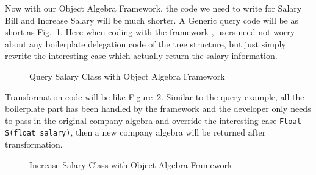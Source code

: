 Now with our Object Algebra Framework, the code we need to write for Salary Bill and Increase Salary will be much shorter. A Generic query code will be as short as Fig.~\ref{query_with_oaframework}. Here when coding with the framework \name, users need not worry about any boilerplate delegation code of the tree structure, but just simply rewrite the interesting case which actually return the salary information.
\begin{figure}[tb]
\vspace{-.1in}
\caption{Query Salary Class with Object Algebra Framework}
\label{query_with_oaframework}
\end{figure}

Transformation code will be like Figure~\ref{transform_with_oaframework}. Similar to the query example, all the boilerplate part has been handled by the framework and the developer only needs to pass in the original company algebra and override the interesting case \lstinline{Float S(float salary)}, then a new company algebra will be returned after transformation.  
\begin{figure}[tb]
\vspace{-.1in}
\caption{Increase Salary Class with Object Algebra Framework}
\label{transform_with_oaframework}
\end{figure}

